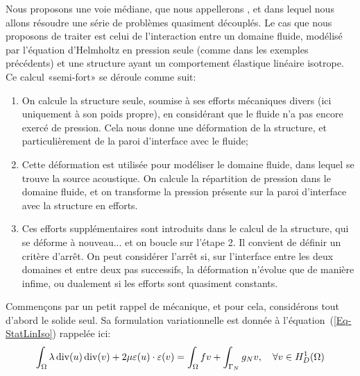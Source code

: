 \medskip
Nous proposons une voie médiane, que nous appellerons , et dans lequel nous allons résoudre une série de problèmes quasiment découplés.
Le cas que nous proposons de traiter est celui de l'interaction entre un domaine fluide, modélisé par l'équation d'Helmholtz en pression seule (comme dans les exemples précédents) et une structure ayant un comportement élastique linéaire isotrope.
Ce calcul «semi-fort» se déroule comme suit:
\begin{enumerate}
   \item On calcule la structure seule, soumise à ses efforts mécaniques divers (ici uniquement à son poids propre), en considérant que le fluide n'a pas encore exercé de pression. Cela nous donne une déformation de la structure, et particulièrement de la paroi d'interface avec le fluide;
   \item Cette déformation est utilisée pour modéliser le domaine fluide, dans lequel se trouve la source acoustique. On calcule la répartition de pression dans le domaine fluide, et on transforme la pression présente sur la paroi d'interface avec la structure en efforts.
   \item Ces efforts supplémentaires sont introduits dans le calcul de la structure, qui se déforme à nouveau... et on boucle sur l'étape 2. Il convient de définir un critère d'arrêt. On peut considérer l'arrêt si, sur l'interface entre les deux domaines et entre deux pas successifs, la déformation n'évolue que de manière infime, ou dualement si les efforts sont quasiment constants.
\end{enumerate}

\medskip
Commençons par un petit rappel de mécanique, et pour cela, considérons tout d'abord le solide seul. Sa formulation variationnelle est donnée à l'équation~(\ref{Eq-StatLinIso}) rappelée ici:
\begin{equation*}
\displaystyle\int_\Omega \lambda \operatorname{div}(u)\operatorname{div}(v)+2\mu\varepsilon(u)\cdot\varepsilon(v) = \displaystyle\int_\Omega fv +
\displaystyle\int_{\Gamma_N} g_N v, \quad \forall v\in H^1_D(\Omega)
\end{equation*}

